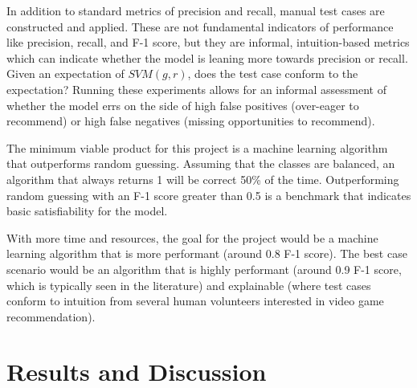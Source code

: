 \documentclass[10pt,twocolumn]{article}
\begin{document}
In addition to standard metrics of precision and recall, manual test cases are constructed and applied. These are not fundamental indicators of performance like precision, recall, and F-1 score, but they are informal, intuition-based metrics which can indicate whether the model is leaning more towards precision or recall. Given an expectation of $SVM(g, r)$, does the test case conform to the expectation? Running these experiments allows for an informal assessment of whether the model errs on the side of high false positives (over-eager to recommend) or high false negatives (missing opportunities to recommend).

The minimum viable product for this project is a machine learning algorithm that outperforms random guessing. Assuming that the classes are balanced, an algorithm that always returns 1 will be correct 50\% of the time. Outperforming random guessing with an F-1 score greater than 0.5 is a benchmark that indicates basic satisfiability for the model.

With more time and resources, the goal for the project would be a machine learning algorithm that is more performant (around 0.8 F-1 score). The best case scenario would be an algorithm that is highly performant (around 0.9 F-1 score, which is typically seen in the literature) and explainable (where test cases conform to intuition from several human volunteers interested in video game recommendation).

\section{Results and Discussion}

\end{document}
